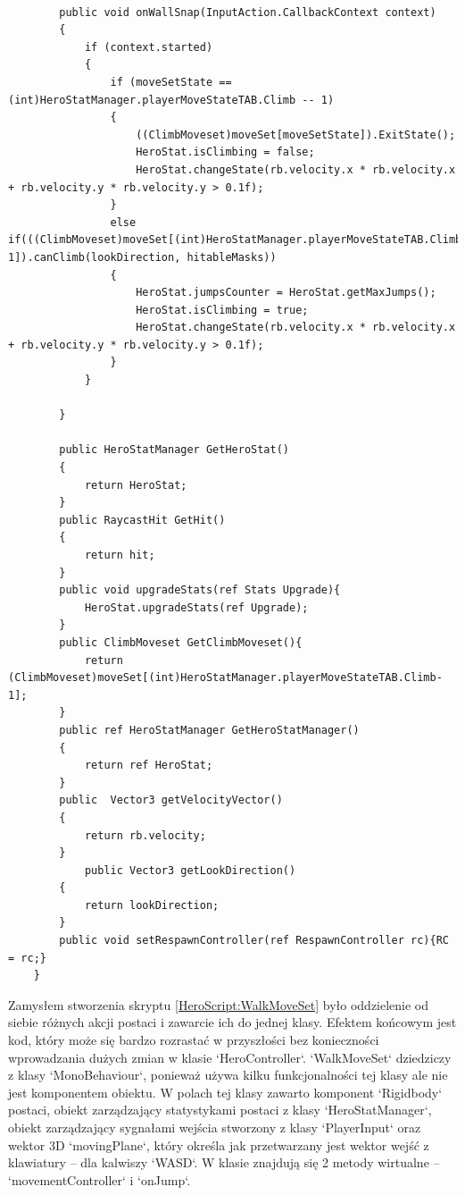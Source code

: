 \documentclass[12pt,twoside]{article}
\begin{document}
\begin{lstlisting}[language={[Sharp]C},caption=Skyrpt HeroController -- HeroController,label={HeroScript:HeroController}]
    
        public void onWallSnap(InputAction.CallbackContext context)
        {
            if (context.started)
            {
                if (moveSetState == (int)HeroStatManager.playerMoveStateTAB.Climb -- 1)
                {
                    ((ClimbMoveset)moveSet[moveSetState]).ExitState();
                    HeroStat.isClimbing = false;
                    HeroStat.changeState(rb.velocity.x * rb.velocity.x + rb.velocity.y * rb.velocity.y > 0.1f);
                }
                else if(((ClimbMoveset)moveSet[(int)HeroStatManager.playerMoveStateTAB.Climb-1]).canClimb(lookDirection, hitableMasks))
                {
                    HeroStat.jumpsCounter = HeroStat.getMaxJumps();
                    HeroStat.isClimbing = true;
                    HeroStat.changeState(rb.velocity.x * rb.velocity.x + rb.velocity.y * rb.velocity.y > 0.1f);
                }
            }
    
        }
    
        public HeroStatManager GetHeroStat()
        {
            return HeroStat;
        }
        public RaycastHit GetHit()
        {
            return hit;
        }
        public void upgradeStats(ref Stats Upgrade){
            HeroStat.upgradeStats(ref Upgrade);
        }
        public ClimbMoveset GetClimbMoveset(){
            return (ClimbMoveset)moveSet[(int)HeroStatManager.playerMoveStateTAB.Climb-1];
        }
        public ref HeroStatManager GetHeroStatManager()
        {
            return ref HeroStat;
        }
        public  Vector3 getVelocityVector()
        {
            return rb.velocity;
        }
            public Vector3 getLookDirection()
        {
            return lookDirection;
        }
        public void setRespawnController(ref RespawnController rc){RC = rc;}
    }
\end{lstlisting}

Zamysłem stworzenia skryptu \ref{HeroScript:WalkMoveSet} było oddzielenie od
siebie różnych akcji postaci i zawarcie ich do jednej klasy. Efektem końcowym
jest kod, który może się bardzo rozrastać w przyszłości bez konieczności
wprowadzania dużych zmian w klasie `HeroController`. `WalkMoveSet` dziedziczy z
klasy `MonoBehaviour`, ponieważ używa kilku funkcjonalności tej klasy ale nie
jest komponentem obiektu. W polach tej klasy zawarto komponent `Rigidbody`
postaci, obiekt zarządzający statystykami postaci z klasy `HeroStatManager`,
obiekt zarządzający sygnałami wejścia stworzony z klasy `PlayerInput` oraz
wektor 3D `movingPlane`, który określa jak przetwarzany jest wektor wejść z
klawiatury -- dla kalwiszy `WASD`. W klasie znajdują się 2 metody wirtualne --
`movementController` i `onJump`.
\end{document}
